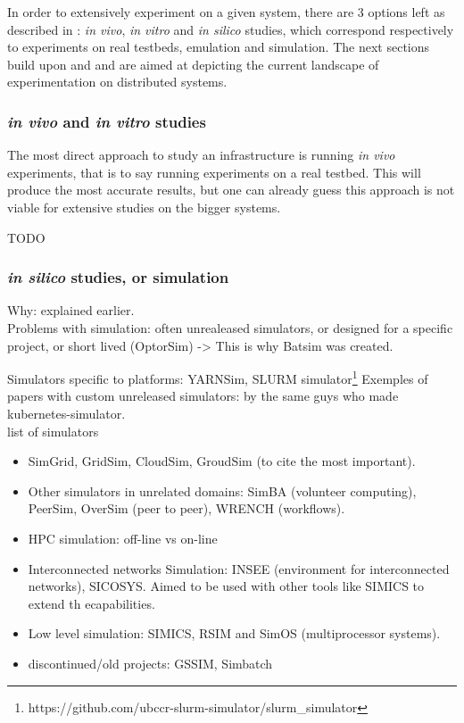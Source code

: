 \documentclass[12pt, a4paper]{memoir}
\begin{document}
In order to extensively experiment on a given system, there are 3 options left
as described in \cite{legrand2015scheduling}: \textit{in vivo}, \textit{in
vitro} and \textit{in silico} studies, which correspond respectively to
experiments on real testbeds, emulation and simulation.  The next sections
build upon \cite{legrand2015scheduling} and \cite{casanova:hal-01017319} and
are aimed at depicting the current landscape of experimentation on distributed
systems.

\subsubsection{\textit{in vivo} and \textit{in vitro} studies}

The most direct approach to study an infrastructure is running \textit{in vivo}
experiments, that is to say running experiments on a real testbed. This will
produce the most accurate results, but one can already guess this approach is
not viable for extensive studies on the bigger systems.

TODO

\subsubsection{\textit{in silico} studies, or simulation}

Why: explained earlier.\\

Problems with simulation: often unrealeased simulators, or designed for a specific project, or short lived (OptorSim) -> This is why Batsim was created.

Simulators specific to platforms: YARNSim, SLURM simulator\footnote{https://github.com/ubccr-slurm-simulator/slurm\_simulator} 
Exemples of papers with custom unreleased simulators: \cite{yabuuchi2019lowlatency} by the same guys who made kubernetes-simulator.\\

list of simulators
\begin{itemize}
	\item SimGrid, GridSim, CloudSim, GroudSim (to cite the most important).
	\item Other simulators in unrelated domains: SimBA (volunteer computing), PeerSim, OverSim (peer to peer), WRENCH (workflows).
	\item HPC simulation: off-line vs on-line
	\item Interconnected networks Simulation: INSEE (environment for interconnected networks), SICOSYS. Aimed to be used with other tools like SIMICS to extend th ecapabilities.
	\item Low level simulation: SIMICS, RSIM and SimOS (multiprocessor systems).
	\item discontinued/old projects: GSSIM, Simbatch
\end{itemize}
\end{document}
